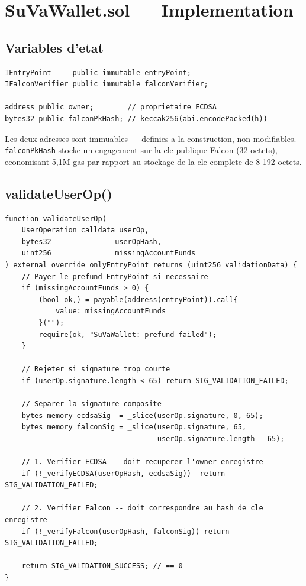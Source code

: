 \documentclass[11pt,a4paper]{article}
\begin{document}
\section{SuVaWallet.sol --- Implementation}

\subsection{Variables d'etat}

\begin{lstlisting}[style=solidity, caption={Etat de SuVaWallet}]
IEntryPoint     public immutable entryPoint;
IFalconVerifier public immutable falconVerifier;

address public owner;        // proprietaire ECDSA
bytes32 public falconPkHash; // keccak256(abi.encodePacked(h))
\end{lstlisting}

Les deux adresses sont immuables --- definies a la construction, non modifiables.
\texttt{falconPkHash} stocke un engagement sur la cle publique Falcon (32 octets),
economisant 5,1M gas par rapport au stockage de la cle complete de 8 192 octets.

\subsection{validateUserOp()}

\begin{lstlisting}[style=solidity, caption={validateUserOp --- logique de double signature}]
function validateUserOp(
    UserOperation calldata userOp,
    bytes32               userOpHash,
    uint256               missingAccountFunds
) external override onlyEntryPoint returns (uint256 validationData) {
    // Payer le prefund EntryPoint si necessaire
    if (missingAccountFunds > 0) {
        (bool ok,) = payable(address(entryPoint)).call{
            value: missingAccountFunds
        }("");
        require(ok, "SuVaWallet: prefund failed");
    }

    // Rejeter si signature trop courte
    if (userOp.signature.length < 65) return SIG_VALIDATION_FAILED;

    // Separer la signature composite
    bytes memory ecdsaSig  = _slice(userOp.signature, 0, 65);
    bytes memory falconSig = _slice(userOp.signature, 65,
                                    userOp.signature.length - 65);

    // 1. Verifier ECDSA -- doit recuperer l'owner enregistre
    if (!_verifyECDSA(userOpHash, ecdsaSig))  return SIG_VALIDATION_FAILED;

    // 2. Verifier Falcon -- doit correspondre au hash de cle enregistre
    if (!_verifyFalcon(userOpHash, falconSig)) return SIG_VALIDATION_FAILED;

    return SIG_VALIDATION_SUCCESS; // == 0
}
\end{lstlisting}
\end{document}
